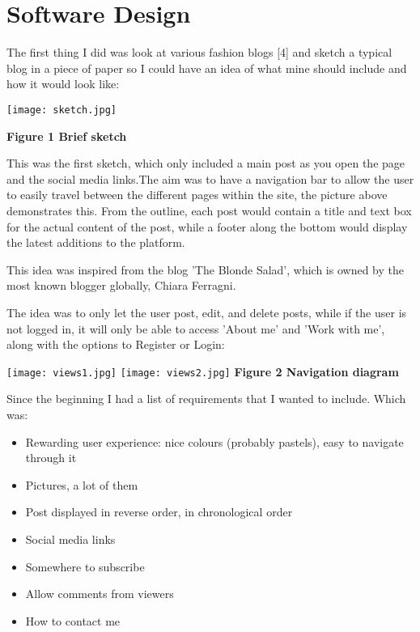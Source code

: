 \documentclass[10pt, a4paper]{article}
\begin{document}
    \section{Software Design}

    The first thing I did was look at various fashion blogs [4] and sketch a typical blog in a piece of paper so I could have an idea of what mine should include and how it would look like:

    \texttt{[image: sketch.jpg]}

    \textbf{Figure 1 Brief sketch}
    \vspace{2mm}

    This was the first sketch, which only included a main post as you open the page and the social media links.The aim was to have a navigation bar to allow the user to easily travel between the different pages within the site, the picture above demonstrates this. From the outline, each post would contain a title and text box for the actual content of the post, while a footer along the bottom would display the latest additions to the platform.


    This idea was inspired from the blog 'The Blonde Salad', which is owned by the most known blogger globally, Chiara Ferragni.

    The idea was to only let the user post, edit, and delete posts, while if the user is not logged in, it will only be able to access 'About me' and 'Work with me', along with the options to Register or Login:

    \texttt{[image: views1.jpg]}
    \texttt{[image: views2.jpg]}
    \textbf{Figure 2 Navigation diagram}
    \vspace{2mm}

    Since the beginning I had a list of requirements that I wanted to include. Which was:
    \begin{itemize}
        \item Rewarding user experience: nice colours (probably pastels), easy to navigate through it
        \item Pictures, a lot of them
        \item Post displayed in reverse order, in chronological order
        \item Social media links
        \item Somewhere to subscribe
        \item Allow comments from viewers
        \item How to contact me
    \end{itemize}
\end{document}

